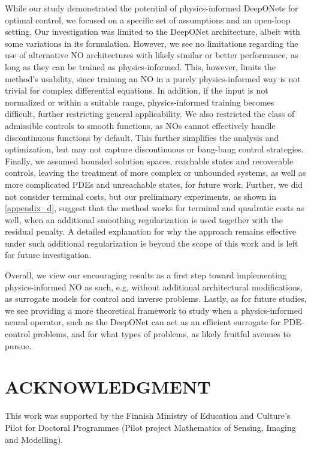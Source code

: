 \documentclass[final,1p,times]{elsarticle}
\theoremstyle{plain} %
\theoremstyle{definition} %
\theoremstyle{remark} %
\begin{document}
While our study demonstrated the potential of physics-informed DeepONets for optimal control, we focused on a specific set of assumptions and an open-loop setting. Our investigation was limited to the DeepONet architecture, albeit with some variations in its formulation. However, we see no limitations regarding the use of alternative NO architectures with likely similar or better performance, as long as they can be trained as physics-informed. This, however, limits the method's usability, since training an NO in a purely physics-informed way is not trivial for complex differential equations. In addition, if the input is not normalized or within a suitable range, physics-informed training becomes difficult, further restricting general applicability. We also restricted the class of admissible controls to smooth functions, as NOs cannot effectively handle discontinuous functions by default. This further simplifies the analysis and optimization, but may not capture discontinuous or bang-bang control strategies. Finally, we assumed bounded solution spaces, reachable states and recoverable controls, leaving the treatment of more complex or unbounded systems, as well as more complicated PDEs and unreachable states, for future work. Further, we did not consider terminal costs, but our preliminary experiments, as shown in \ref{appendix_d}, suggest that the method works for terminal and quadratic costs as well, when an additional smoothing regularization is used together with the residual penalty. A detailed explanation for why the approach remains effective under such additional regularization is beyond the scope of this work and is left for future investigation. 

Overall, we view our encouraging results as a first step toward implementing physics-informed NO as such, e.g, without additional architectural modifications, as surrogate models for control and inverse problems. Lastly, as for future studies, we see providing a more theoretical framework to study when a physics-informed neural operator, such as the DeepONet can act as an efficient surrogate for PDE-control problems, and for what types of problems, as likely fruitful avenues to pursue. 




\section*{ACKNOWLEDGMENT}

This work was supported by the Finnish Ministry of Education and Culture’s Pilot for Doctoral Programmes (Pilot project Mathematics of Sensing, Imaging and Modelling).
\end{document}
